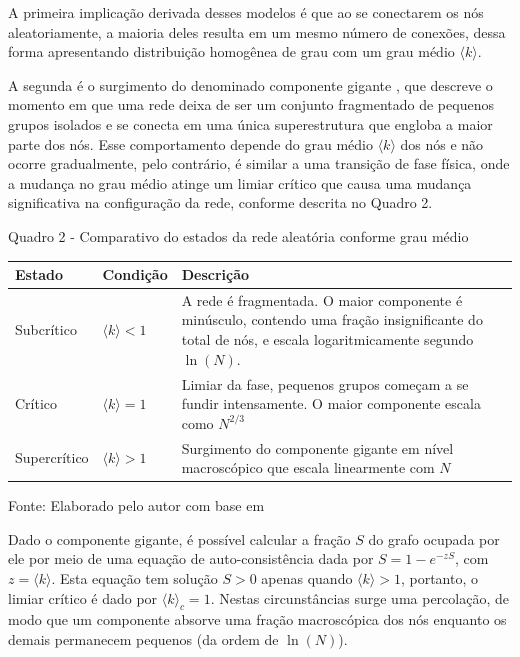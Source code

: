 \documentclass[12pt,oneside,a4paper,brazil,sumario=tradicional]{abntex2}
\begin{document}
A primeira implicação derivada desses modelos é que ao se conectarem os nós aleatoriamente, a maioria deles resulta em um mesmo número de conexões, dessa forma apresentando distribuição homogênea de grau com um grau médio $\langle k \rangle$.

A segunda é o surgimento do denominado componente gigante \parencite{albert2002}, que descreve o momento em que uma rede deixa de ser um conjunto fragmentado de pequenos grupos isolados e se conecta em uma única superestrutura que engloba a maior parte dos nós. Esse comportamento depende do grau médio $\langle k \rangle$ dos nós e não ocorre gradualmente, pelo contrário, é similar a uma transição de fase física, onde a mudança no grau médio atinge um limiar crítico que causa uma mudança significativa na configuração da rede, conforme descrita no Quadro 2.

Quadro 2 - Comparativo do estados da rede aleatória conforme grau médio

\begin{center}
\begin{tabular}{p{4cm}|p{4cm}|p{4cm}}
\toprule
Estado & Condição & Descrição \\
\midrule
Subcrítico & $\langle k \rangle < 1$ & A rede é fragmentada. O maior componente é minúsculo, contendo uma fração insignificante do total de nós, e escala logaritmicamente segundo $\ln(N)$. \\
Crítico & $\langle k \rangle = 1$ & Limiar da fase, pequenos grupos começam a se fundir intensamente. O maior componente escala como $N^{2/3}$ \\
Supercrítico & $\langle k \rangle > 1$ & Surgimento do componente gigante em nível macroscópico que escala linearmente com $N$ \\
\bottomrule
\end{tabular}
\end{center}
Fonte: Elaborado pelo autor com base em \textcite{latora2017}

Dado o componente gigante, é possível calcular a fração $S$ do grafo ocupada por ele por meio de uma equação de auto-consistência dada por $S = 1 - e^{-zS}$, com $z = \langle k \rangle$. Esta equação tem solução $S > 0$ apenas quando $\langle k \rangle > 1$, portanto, o limiar crítico é dado por $\langle k \rangle_{c} = 1$. Nestas circunstâncias surge uma percolação, de modo que um componente absorve uma fração macroscópica dos nós enquanto os demais permanecem pequenos (da ordem de $\ln(N)$).
\end{document}
